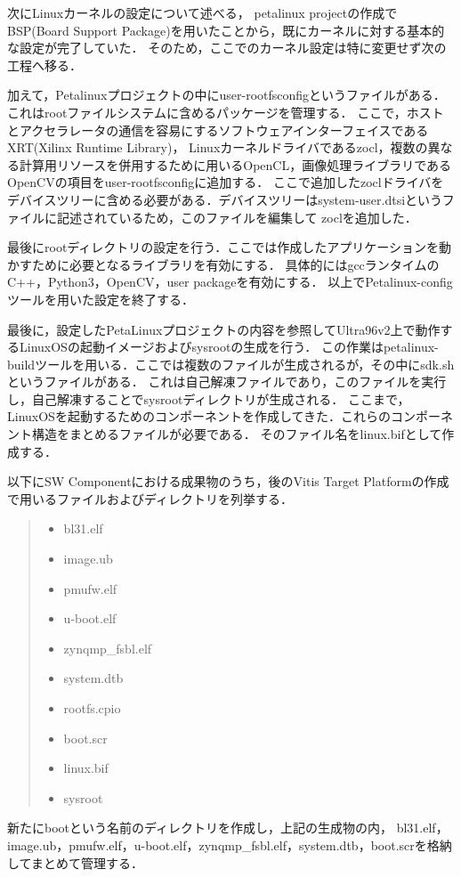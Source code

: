 \documentclass[11pt,a4j]{jreport}
\begin{document}
次にLinuxカーネルの設定について述べる，
petalinux projectの作成でBSP(Board Support Package)を用いたことから，既にカーネルに対する基本的な設定が完了していた．
そのため，ここでのカーネル設定は特に変更せず次の工程へ移る．

加えて，Petalinuxプロジェクトの中にuser-rootfsconfigというファイルがある．これはrootファイルシステムに含めるパッケージを管理する．
ここで，ホストとアクセラレータの通信を容易にするソフトウェアインターフェイスであるXRT(Xilinx Runtime Library)，
Linuxカーネルドライバであるzocl，複数の異なる計算用リソースを併用するために用いるOpenCL，画像処理ライブラリであるOpenCVの項目をuser-rootfsconfigに追加する．
ここで追加したzoclドライバをデバイスツリーに含める必要がある．デバイスツリーはsystem-user.dtsiというファイルに記述されているため，このファイルを編集して
zoclを追加した．

最後にrootディレクトリの設定を行う．ここでは作成したアプリケーションを動かすために必要となるライブラリを有効にする．
具体的にはgccランタイムのC++，Python3，OpenCV，user packageを有効にする．
以上でPetalinux-configツールを用いた設定を終了する．

最後に，設定したPetaLinuxプロジェクトの内容を参照してUltra96v2上で動作するLinuxOSの起動イメージおよびsysrootの生成を行う．
この作業はpetalinux-buildツールを用いる．ここでは複数のファイルが生成されるが，その中にsdk.shというファイルがある．
これは自己解凍ファイルであり，このファイルを実行し，自己解凍することでsysrootディレクトリが生成される．
ここまで，LinuxOSを起動するためのコンポーネントを作成してきた．これらのコンポーネント構造をまとめるファイルが必要である．
そのファイル名をlinux.bifとして作成する．

以下にSW Componentにおける成果物のうち，後のVitis Target Platformの作成で用いるファイルおよびディレクトリを列挙する．
\begin{quote}
  \begin{itemize}
    \item bl31.elf
    \item image.ub
    \item pmufw.elf
    \item u-boot.elf
    \item zynqmp_fsbl.elf
    \item system.dtb
    \item rootfs.cpio
    \item boot.scr
    \item linux.bif
    \item sysroot
  \end{itemize}
\end{quote}
新たにbootという名前のディレクトリを作成し，上記の生成物の内，
bl31.elf，image.ub，pmufw.elf，u-boot.elf，zynqmp_fsbl.elf，system.dtb，boot.scrを格納してまとめて管理する．
\end{document}
